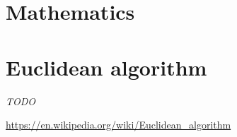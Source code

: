 \section{Mathematics}

\section{Euclidean algorithm}

\textit{TODO}

\url{https://en.wikipedia.org/wiki/Euclidean_algorithm}
